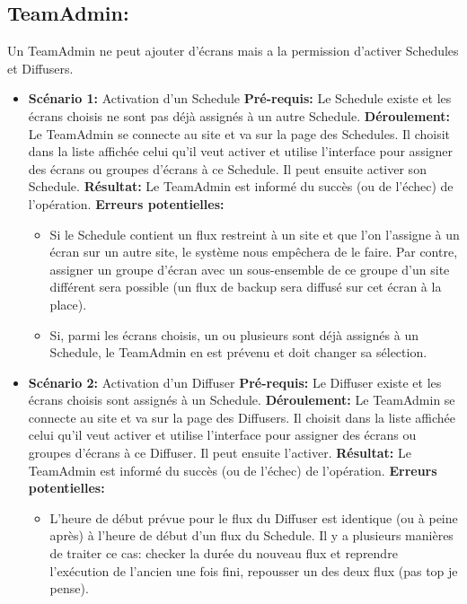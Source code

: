 \documentclass[french]{article}
\begin{document}
	\subsection{TeamAdmin:} 
	Un TeamAdmin ne peut ajouter d'écrans mais a la permission d'activer Schedules et Diffusers. \newline
		\begin{itemize}	
			\item \textbf{Scénario 1:} Activation d'un Schedule\newline
			\textbf{Pré-requis:} Le Schedule existe et les écrans choisis ne sont pas déjà assignés à un autre Schedule.\newline
			\textbf{Déroulement:} Le TeamAdmin se connecte au site et va sur la page des Schedules. Il choisit dans la liste affichée celui qu'il veut activer et utilise l'interface pour assigner des écrans ou groupes d'écrans à ce Schedule. Il peut ensuite activer son Schedule. \newline
			\textbf{Résultat:} Le TeamAdmin est informé du succès (ou de l'échec) de l'opération.\newline
			\textbf{Erreurs potentielles:} 
			\begin{itemize}
				\item Si le Schedule contient un flux restreint à un site et que l'on l'assigne à un écran sur un autre site, le système nous empêchera de le faire. Par contre, assigner un groupe d'écran avec un sous-ensemble de ce groupe d'un site différent sera possible (un flux de backup sera diffusé sur cet écran à la place).
				\item Si, parmi les écrans choisis, un ou plusieurs sont déjà assignés à un Schedule, le TeamAdmin en est prévenu et doit changer sa sélection. \newline
			\end{itemize}			
		
		\item \textbf{Scénario 2:} Activation d'un Diffuser\newline
			\textbf{Pré-requis:} Le Diffuser existe et les écrans choisis sont assignés à un Schedule.\newline
			\textbf{Déroulement:} Le TeamAdmin se connecte au site et va sur la page des Diffusers. Il choisit dans la liste affichée celui qu'il veut activer et utilise l'interface pour assigner des écrans ou groupes d'écrans à ce Diffuser. Il peut ensuite l'activer. \newline
			\textbf{Résultat:} Le TeamAdmin est informé du succès (ou de l'échec) de l'opération.\newline
			\textbf{Erreurs potentielles:} 
			\begin{itemize}
				\item L'heure de début prévue pour le flux du Diffuser est identique (ou à peine après) à l'heure de début d'un flux du Schedule. Il y a plusieurs manières de traiter ce cas: checker la durée du nouveau flux et reprendre l'exécution de l'ancien une fois fini, repousser un des deux flux (pas top je pense).\newline
			\end{itemize}			
			   

\end{itemize}
\end{document}
